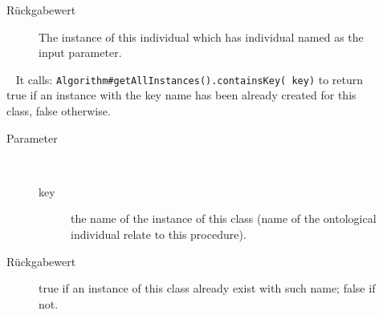 \begin{description}
\begin{description}
\begin{description}
\end{description}
\item[Rückgabewert] 
The instance of this individual which has individual 
 named as the input parameter.
\end{description}
\item[{\ltdHypertarget{ontologyFramework.OFProcedureManagment.Algorithm.isInAllInstances(java.lang.String)}{isInAllInstances}\label{ontologyFramework.OFProcedureManagment.Algorithm.isInAllInstances(java.lang.String)}}]
~ It calls: \verb!Algorithm#getAllInstances().containsKey( key)!
 to return true if an instance with the key name has been 
 already created for this class, false otherwise.
\begin{description}
\item[Parameter] ~
\begin{description}
\item[key]
the name of the instance of this class 
 (name of the ontological individual relate to this procedure).
\end{description}
\item[Rückgabewert] 
true if an instance of this class already exist with such
 name; false if not.
\end{description}
\end{description}
